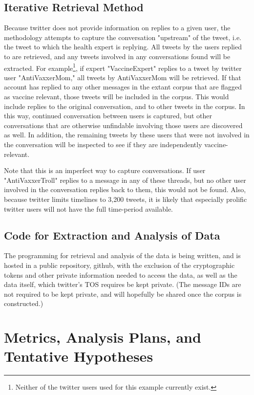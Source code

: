 \documentclass{article}
\begin{document}
\subsection{Iterative Retrieval Method}
Because twitter does not provide information on replies to a given user, the methodology attempts to capture the conversation "upstream" of the tweet, i.e. the tweet to which the health expert is replying. All tweets by the users replied to are retrieved, and any tweets involved in any conversations found will be extracted. For example\footnote{Neither of the twitter users used for this example currently exist.}, if expert "VaccineExpert" replies to a tweet by twitter user "AntiVaxxerMom," all tweets by AntiVaxxerMom will be retrieved. If that account has replied to any other messages in the extant corpus that are flagged as vaccine relevant, those tweets will be included in the corpus. This would include replies to the original conversation, and to other tweets in the corpus. In this way, continued conversation between users is captured, but other conversations that are otherwise unfindable involving those users are discovered as well. In addition, the remaining tweets by these users that were not involved in the conversation will be inspected to see if they are independently vaccine-relevant.

Note that this is an imperfect way to capture conversations. If user "AntiVaxxerTroll" replies to a message in any of these threads, but no other user involved in the conversation replies back to them, this would not be found. Also, because twitter limits timelines to 3,200 tweets, it is likely that especially prolific twitter users will not have the full time-period available.

\subsection{Code for Extraction and Analysis of Data}
The programming for retrieval and analysis of the data is being written, and is hosted in a public repository, github, with the exclusion of the cryptographic tokens and other private information needed to access the data, as well as the data itself, which twitter's TOS requires be kept private. (The message IDs are not required to be kept private, and will hopefully be shared once the corpus is constructed.)

\section{Metrics, Analysis Plans, and Tentative Hypotheses}
\end{document}
